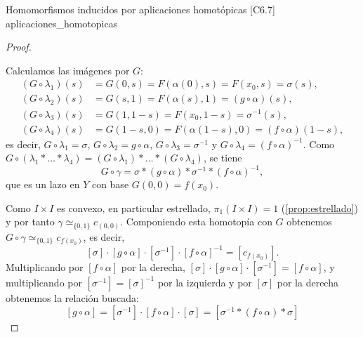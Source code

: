 \begin{teorema}{Homomorfismos inducidos por aplicaciones homotópicas [C6.7] \marcaT}{aplicaciones_homotopicas}
\begin{proof}
\begin{center}
\end{center}

Calculamos las imágenes por $G$:
\begin{align*}
(G \circ \lambda_1)(s) &= G(0,s) = F(\alpha(0),s) = F(x_0,s) = \sigma(s), \\
(G \circ \lambda_2)(s) &= G(s,1) = F(\alpha(s),1) = (g \circ \alpha)(s), \\
(G \circ \lambda_3)(s) &= G(1,1-s) = F(x_0,1-s) = \sigma^{-1}(s), \\
(G \circ \lambda_4)(s) &= G(1-s,0) = F(\alpha(1-s),0) = (f \circ \alpha)(1-s),
\end{align*}
es decir, $G \circ \lambda_1 = \sigma$, $G \circ \lambda_2 = g \circ \alpha$, $G \circ \lambda_3 = \sigma^{-1}$ y $G \circ \lambda_4 = (f \circ \alpha)^{-1}$.
Como $G \circ (\lambda_1 * \dots * \lambda_4) = (G \circ \lambda_1) * \dots * (G \circ \lambda_4)$, se tiene
\[ G \circ \gamma = \sigma * (g \circ \alpha) * \sigma^{-1} * (f \circ \alpha)^{-1}, \]
que es un lazo en $Y$ con base $G(0,0) = f(x_0)$.

Como $I \times I$ es convexo, en particular estrellado, $\pi_1(I \times I) = 1$ (\cref{prop:estrellado}) y por tanto $\gamma \simeq_{\{0,1\}} c_{(0,0)}$. Componiendo esta homotopía con $G$ obtenemos $G \circ \gamma \simeq_{\{0,1\}} c_{f(x_0)}$, es decir,
\[ [\sigma] \cdot [g \circ \alpha] \cdot [\sigma^{-1}] \cdot [f \circ \alpha]^{-1} = [c_{f(x_0)}]. \]
Multiplicando por $[f \circ \alpha]$ por la derecha, $[\sigma] \cdot [g \circ \alpha] \cdot [\sigma^{-1}] = [f \circ \alpha]$, y multiplicando por $[\sigma^{-1}] = [\sigma]^{-1}$ por la izquierda y por $[\sigma]$ por la derecha obtenemos la relación buscada:
\[ [g \circ \alpha] = [\sigma^{-1}] \cdot [f \circ \alpha] \cdot [\sigma] = [\sigma^{-1} * (f \circ \alpha) * \sigma] \]
\end{proof}


\end{teorema}

